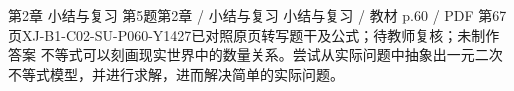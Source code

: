 \par\noindent\begin{minipage}{\linewidth}
\begin{bankitem}{第2章 小结与复习 第5题}{第2章 / 小结与复习 小结与复习 / 教材 p.60 / PDF 第67页}{XJ-B1-C02-SU-P060-Y1427}{已对照原页转写题干及公式；待教师复核；未制作答案}
不等式可以刻画现实世界中的数量关系。尝试从实际问题中抽象出一元二次不等式模型，并进行求解，进而解决简单的实际问题。
\end{bankitem}
\end{minipage}\par\medskip
